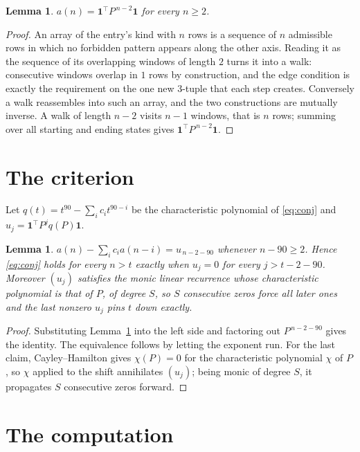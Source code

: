 \documentclass[11pt,a4paper]{article}
\theoremstyle{plain}
\newtheorem{lemma}[theorem]{Lemma}
\theoremstyle{definition}
\begin{document}
\begin{lemma}\label{lem:walk}
$a(n)=\mathbf{1}^{\!\top}P^{\,n-2}\mathbf{1}$ for every $n\ge2$.
\end{lemma}

\begin{proof}
An array of the entry's kind with $n$ rows is a sequence of $n$ admissible rows in
which no forbidden pattern appears along the other axis. Reading it as the sequence of its
overlapping windows of length $2$ turns it into a walk: consecutive windows overlap in
$1$ rows by construction, and the edge condition is exactly the requirement on the one
new $3$-tuple that each step creates. Conversely a walk reassembles into such an array,
and the two constructions are mutually inverse. A walk of length $n-2$ visits $n-1$
windows, that is $n$ rows; summing over all starting and ending states gives
$\mathbf{1}^{\!\top}P^{\,n-2}\mathbf{1}$.
\end{proof}

\section{The criterion}

Let $q(t)=t^{90}-\sum_i c_i t^{90-i}$ be the characteristic polynomial of
\eqref{eq:conj} and $u_j=\mathbf{1}^{\!\top}P^{j}q(P)\mathbf{1}$.

\begin{lemma}\label{lem:crit}
$a(n)-\sum_i c_i a(n-i)=u_{\,n-2-90}$ whenever $n-90\ge2$. Hence
\eqref{eq:conj} holds for every $n>t$ exactly when $u_j=0$ for every
$j>t-2-90$. Moreover $(u_j)$ satisfies the monic linear recurrence whose
characteristic polynomial is that of $P$, of degree $S$, so $S$ consecutive zeros force all
later ones and the last nonzero $u_j$ pins $t$ down exactly.
\end{lemma}

\begin{proof}
Substituting Lemma~\ref{lem:walk} into the left side and factoring out
$P^{\,n-2-90}$ gives the identity. The equivalence follows by letting the exponent
run. For the last claim, Cayley--Hamilton gives $\chi(P)=0$ for the characteristic
polynomial $\chi$ of $P$, so $\chi$ applied to the shift annihilates $(u_j)$; being monic of
degree $S$, it propagates $S$ consecutive zeros forward.
\end{proof}

\section{The computation}
\end{document}
